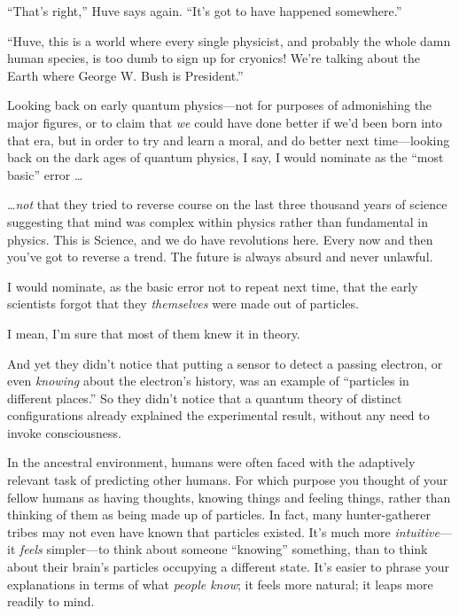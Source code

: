 {
 ``That's
right,'' Huve says again.
``It's got to have happened
somewhere.''}

{
 ``Huve, this is a world where every single
physicist, and probably the whole damn human species, is too dumb to
sign up for cryonics! We're talking about the Earth
where George W. Bush is President.''}

\myendsectiontext


{
 Looking back on early quantum physics---not for purposes of
admonishing the major figures, or to claim that \textit{we} could have
done better if we'd been born into that era, but in
order to try and learn a moral, and do better next time---looking back
on the dark ages of quantum physics, I say, I would nominate as the
``most basic'' error \ldots}

{
 \ldots \textit{not} that they tried to reverse course on the last
three thousand years of science suggesting that mind was complex within
physics rather than fundamental in physics. This is Science, and we do
have revolutions here. Every now and then you've got to
reverse a trend. The future is always absurd and never unlawful.}

{
 I would nominate, as the basic error not to repeat next time, that
the early scientists forgot that they \textit{themselves} were made out
of particles.}

{
 I mean, I'm sure that most of them knew it in
theory.}

{
 And yet they didn't notice that putting a sensor
to detect a passing electron, or even \textit{knowing} about the
electron's history, was an example of
``particles in different places.''
So they didn't notice that a quantum theory of distinct
configurations already explained the experimental result, without any
need to invoke consciousness.}

{
 In the ancestral environment, humans were often faced with the
adaptively relevant task of predicting other humans. For which purpose
you thought of your fellow humans as having thoughts, knowing things
and feeling things, rather than thinking of them as being made up of
particles. In fact, many hunter-gatherer tribes may not even have known
that particles existed. It's much more
\textit{intuitive}{}---it \textit{feels} simpler---to think about
someone ``knowing'' something, than
to think about their brain's particles occupying a
different state. It's easier to phrase your
explanations in terms of what \textit{people know}; it feels more
natural; it leaps more readily to mind.}

